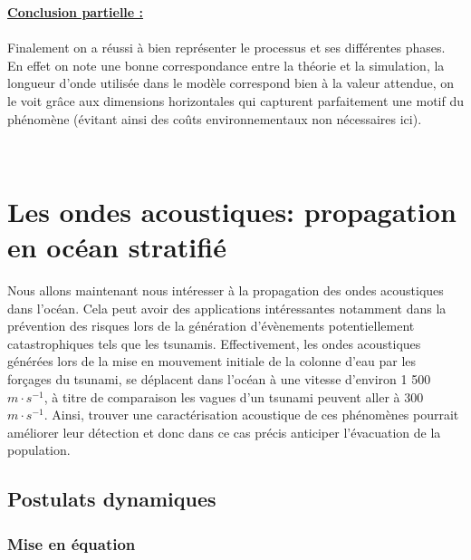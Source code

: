 \documentclass{rapportECC}
\begin{document}
\underline{\textbf{Conclusion partielle :}} \\
\\


Finalement on a réussi à bien représenter le processus et ses différentes phases. En effet on note une bonne correspondance entre la théorie et la simulation, la longueur d'onde utilisée dans le modèle correspond bien à la valeur attendue, on le voit grâce aux dimensions horizontales qui capturent parfaitement une motif du phénomène (évitant ainsi des coûts environnementaux non nécessaires ici).

\\






\section{Les ondes acoustiques: propagation en océan stratifié}

Nous allons maintenant nous intéresser à la propagation des ondes acoustiques dans l'océan. Cela peut avoir des applications intéressantes notamment dans la prévention des risques lors de la génération d'évènements potentiellement catastrophiques tels que les tsunamis. Effectivement, les ondes acoustiques générées lors de la mise en mouvement initiale de la colonne d'eau par les forçages du tsunami, se déplacent dans l'océan à une vitesse d'environ 1 500 $m \cdot s^{-1}$, à titre de comparaison les vagues d'un tsunami peuvent aller à 300 $m \cdot s^{-1}$. Ainsi, trouver une caractérisation acoustique de ces phénomènes pourrait améliorer leur détection et donc dans ce cas précis anticiper l'évacuation de la population.

\subsection{Postulats dynamiques}
\subsubsection{Mise en équation}
\end{document}

